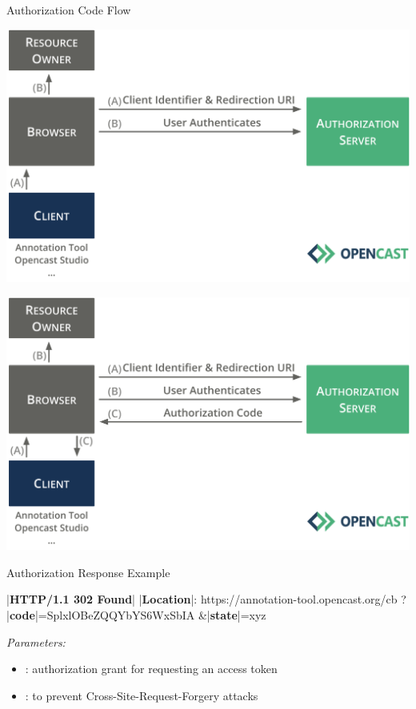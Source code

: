\documentclass[aspectratio=169]{beamer}
\begin{document}
\begin{frame}{Authorization Code Flow}
	\vspace*{0.5em}
	\begin{overprint}
		\centerline{\includegraphics[height=0.84\textheight]{figures/authorization-code-flow-03}}
		\centerline{\includegraphics[height=0.84\textheight]{figures/authorization-code-flow-04}}
	\end{overprint}
	\vspace{-2em}
\end{frame}

\begin{frame}[fragile]{Authorization Response Example}
\begin{textcode}
|\textbf{HTTP/1.1 302 Found}|
|\textbf{Location}|: https://annotation-tool.opencast.org/cb
           ?|\textbf{code}|=SplxlOBeZQQYbYS6WxSbIA
           &|\textbf{state}|=xyz
\end{textcode}

\hfill {}
	
	\emph{Parameters:}
	\begin{itemize}
		\item {}: authorization grant for requesting an access token
		\item {}: to prevent Cross-Site-Request-Forgery attacks \hfill {}
	\end{itemize}
	
\end{frame}
\end{document}

